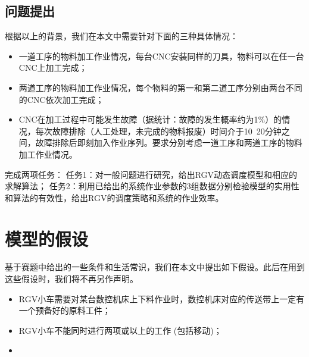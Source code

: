 \documentclass{cumcmthesis}
\begin{document}
	\subsection{问题提出}
	根据以上的背景，我们在本文中需要针对下面的三种具体情况：
	
	\begin{itemize}
		\item 一道工序的物料加工作业情况，每台CNC安装同样的刀具，物料可以在任一台CNC上加工完成；
		\item 两道工序的物料加工作业情况，每个物料的第一和第二道工序分别由两台不同的CNC依次加工完成；
		\item CNC在加工过程中可能发生故障（据统计：故障的发生概率约为1\%）的情况，每次故障排除（人工处理，未完成的物料报废）时间介于10~20分钟之间，故障排除后即刻加入作业序列。要求分别考虑一道工序和两道工序的物料加工作业情况。
	\end{itemize}
	
	完成两项任务：\newline
	任务1：对一般问题进行研究，给出RGV动态调度模型和相应的求解算法；\newline
	任务2：利用已给出的系统作业参数的3组数据分别检验模型的实用性和算法的有效性，给出RGV的调度策略和系统的作业效率。
	
	\section{模型的假设}
	基于赛题中给出的一些条件和生活常识，我们在本文中提出如下假设。此后在用到这些假设时，我们将不再另作声明。
	\begin{itemize}
	\item RGV小车需要对某台数控机床上下料作业时，数控机床对应的传送带上一定有一个预备好的原料工件；
	\item RGV小车不能同时进行两项或以上的工作 (包括移动)；
	\item 
	\end{itemize}
	
	
\end{document}
